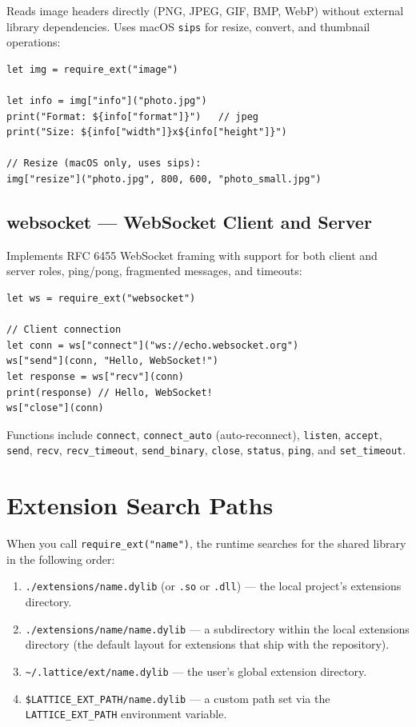 Reads image headers directly (PNG, JPEG, GIF, BMP, WebP) without external library dependencies.
Uses macOS \lstinline|sips| for resize, convert, and thumbnail operations:

\begin{lstlisting}[language=Lattice, caption={Using the image extension}]
let img = require_ext("image")

let info = img["info"]("photo.jpg")
print("Format: ${info["format"]}")   // jpeg
print("Size: ${info["width"]}x${info["height"]}")

// Resize (macOS only, uses sips):
img["resize"]("photo.jpg", 800, 600, "photo_small.jpg")
\end{lstlisting}

\subsection{websocket --- WebSocket Client and Server}

Implements RFC 6455 WebSocket framing with support for both client and server roles, ping/pong, fragmented messages, and timeouts:

\begin{lstlisting}[language=Lattice, caption={Using the WebSocket extension}]
let ws = require_ext("websocket")

// Client connection
let conn = ws["connect"]("ws://echo.websocket.org")
ws["send"](conn, "Hello, WebSocket!")
let response = ws["recv"](conn)
print(response) // Hello, WebSocket!
ws["close"](conn)
\end{lstlisting}

Functions include \lstinline|connect|, \lstinline|connect_auto| (auto-reconnect), \lstinline|listen|, \lstinline|accept|, \lstinline|send|, \lstinline|recv|, \lstinline|recv_timeout|, \lstinline|send_binary|, \lstinline|close|, \lstinline|status|, \lstinline|ping|, and \lstinline|set_timeout|.


\section{Extension Search Paths}\label{sec:ext-search-paths}

When you call \lstinline|require_ext("name")|, the runtime searches for the shared library in the following order:

\begin{enumerate}
  \item \lstinline|./extensions/name.dylib| (or \lstinline|.so| or \lstinline|.dll|) --- the local project's extensions directory.
  \item \lstinline|./extensions/name/name.dylib| --- a subdirectory within the local extensions directory (the default layout for extensions that ship with the repository).
  \item \lstinline|~/.lattice/ext/name.dylib| --- the user's global extension directory.
  \item \lstinline|$LATTICE_EXT_PATH/name.dylib| --- a custom path set via the \lstinline|LATTICE_EXT_PATH| environment variable.
\end{enumerate}

